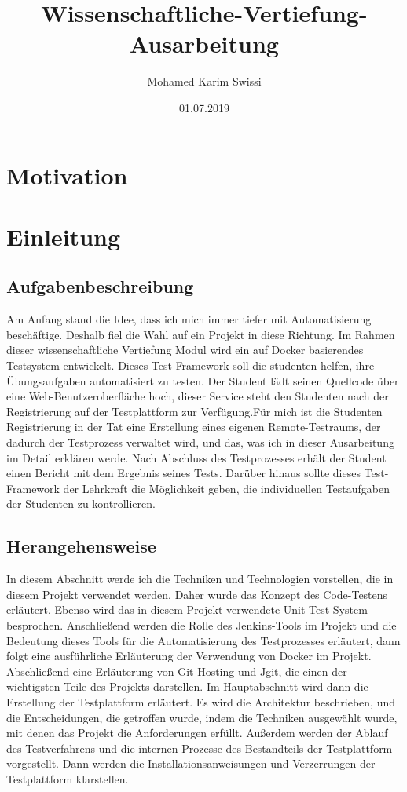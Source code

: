 \documentclass[a4paper,12pt,oneside]{book}
\title{Wissenschaftliche-Vertiefung-Ausarbeitung}
\date{01.07.2019}
\author{Mohamed Karim Swissi  }
\begin{document}
	
\tableofcontents
\newpage
{}
\listoffigures
{}
\lstlistoflistings
\newpage
\chapter{Motivation}
\chapter{Einleitung}
\section{Aufgabenbeschreibung}

Am Anfang stand die Idee, dass ich mich immer tiefer mit Automatisierung beschäftige. Deshalb fiel die Wahl auf ein Projekt in diese Richtung.
Im Rahmen dieser wissenschaftliche Vertiefung Modul wird ein auf Docker basierendes Testsystem entwickelt.
Dieses Test-Framework soll die studenten helfen, ihre Übungsaufgaben automatisiert zu testen.
\newline
Der Student lädt seinen Quellcode über eine Web-Benutzeroberfläche hoch, dieser Service steht den Studenten nach der Registrierung auf der Testplattform zur Verfügung.Für mich ist die Studenten Registrierung in der Tat eine Erstellung eines eigenen Remote-Testraums, der dadurch der Testprozess verwaltet wird, und das, was ich in dieser Ausarbeitung im Detail erklären werde. Nach Abschluss des Testprozesses erhält der Student einen Bericht mit dem Ergebnis seines Tests. Darüber hinaus sollte dieses Test-Framework der Lehrkraft  die Möglichkeit geben, die individuellen Testaufgaben der Studenten zu kontrollieren.
\section{Herangehensweise}
In diesem Abschnitt werde ich die Techniken und Technologien vorstellen, die in diesem Projekt verwendet werden. Daher wurde das Konzept des Code-Testens erläutert. Ebenso wird das in diesem Projekt verwendete Unit-Test-System besprochen. Anschließend werden die Rolle des Jenkins-Tools im Projekt und die Bedeutung dieses Tools für die Automatisierung des Testprozesses erläutert, dann folgt eine ausführliche Erläuterung der Verwendung von Docker im Projekt. Abschließend eine Erläuterung von Git-Hosting und Jgit, die einen der wichtigsten Teile des Projekts darstellen.
\newline
Im Hauptabschnitt wird dann die Erstellung der Testplattform erläutert. Es wird die Architektur beschrieben, und die Entscheidungen, die getroffen wurde, indem die Techniken ausgewählt wurde, mit denen das Projekt die Anforderungen erfüllt. Außerdem werden der Ablauf des Testverfahrens und die internen Prozesse des Bestandteils der Testplattform vorgestellt. Dann werden die Installationsanweisungen und Verzerrungen der Testplattform klarstellen.
\end{document}
